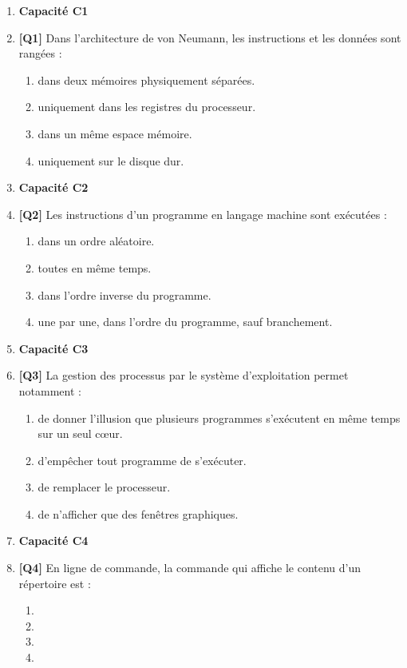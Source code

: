 \begin{enumerate}

\item[] \textbf{Capacité C1}

\item \textbf{[Q1]} Dans l'architecture de von Neumann, les instructions et les données sont rangées :
  \begin{enumerate}[label=\Alph*.]
    \item dans deux mémoires physiquement séparées.
    \item uniquement dans les registres du processeur.
    \item dans un même espace mémoire.
    \item uniquement sur le disque dur.
  \end{enumerate}

\item[] \textbf{Capacité C2}

\item \textbf{[Q2]} Les instructions d'un programme en langage machine sont exécutées :
  \begin{enumerate}[label=\Alph*.]
    \item dans un ordre aléatoire.
    \item toutes en même temps.
    \item dans l'ordre inverse du programme.
    \item une par une, dans l'ordre du programme, sauf branchement.
  \end{enumerate}

\item[] \textbf{Capacité C3}

\item \textbf{[Q3]} La gestion des processus par le système d'exploitation permet notamment :
  \begin{enumerate}[label=\Alph*.]
    \item de donner l'illusion que plusieurs programmes s'exécutent en même temps sur un seul cœur.
    \item d'empêcher tout programme de s'exécuter.
    \item de remplacer le processeur.
    \item de n'afficher que des fenêtres graphiques.
  \end{enumerate}

\item[] \textbf{Capacité C4}

\item \textbf{[Q4]} En ligne de commande, la commande qui affiche le contenu d'un répertoire est :
  \begin{enumerate}[label=\Alph*.]
    \item {}
    \item {}
    \item {}
    \item {}
  \end{enumerate}


\end{enumerate}
